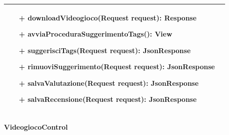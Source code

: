\begin{tabular}{|| l | p{28em} ||}
\begin{itemize}
		\item[+] downloadVideogioco(Request request): Response
		\item[+] avviaProceduraSuggerimentoTags(): View
		\item[+] suggerisciTags(Request request): JsonResponse
		\item[+] rimuoviSuggerimento(Request request): JsonResponse
		\item[+] salvaValutazione(Request request): JsonResponse
		\item[+] salvaRecensione(Request request): JsonResponse
	\end{itemize}\\
	\hline
\end{tabular}

\newpage
\paragraph{VideogiocoControl}
